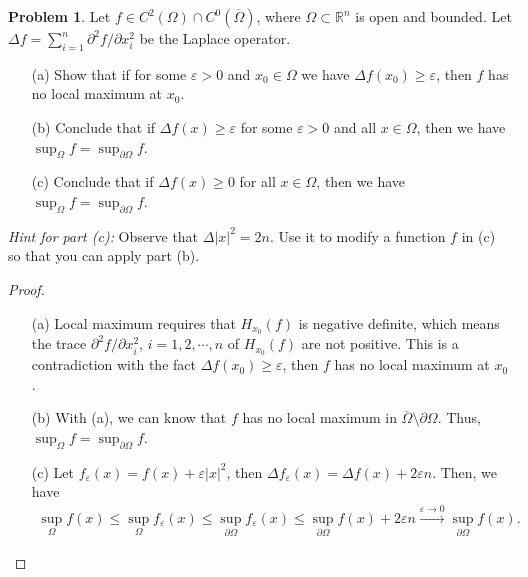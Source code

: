 \documentclass[11pt]{article}
\theoremstyle{definition}
\newtheorem{problem}{Problem}
\theoremstyle{definition}
\begin{document}
\begin{problem}
Let $f \in C^2(\Omega) \cap C^0(\overline{\Omega})$, where $\Omega \subset \mathbb{R}^n$ is open and bounded.
Let $\Delta f = \sum_{i=1}^n \partial^2f/\partial x_i^2$ be the Laplace operator.
\begin{enumerate}
    \item[(a)] Show that if for some $\varepsilon > 0$ and $x_0 \in \Omega$ we have $\Delta f(x_0) \geq \varepsilon$, then $f$ has no local maximum at $x_0$.
    
    \item[(b)] Conclude that if $\Delta f(x) \geq \varepsilon$ for some $\varepsilon > 0$ and all $x \in \Omega$, then we have $\sup_{\Omega} f = \sup_{\partial \Omega} f$.
    
    \item[(c)] Conclude that if $\Delta f(x) \geq 0$ for all $x \in \Omega$, then we have $\sup_{\Omega} f = \sup_{\partial \Omega} f$.
\end{enumerate}
{\em Hint for part (c):} Observe that $\Delta |x|^2 = 2n$. Use it to modify a function $f$ in (c) so that you can apply part (b).
\end{problem}

\begin{proof}
~\begin{enumerate}
    \item[(a)] Local maximum requires that $H_{x_0}(f)$ is negative definite, which means the trace $\partial^2f/\partial x_i^2$, $i = 1,2,\cdots,n$ of $H_{x_0}(f)$ are not positive. This is a contradiction with the fact $\Delta f(x_0) \geq \varepsilon$, then $f$ has no local maximum at $x_0$.
    
    \item[(b)] With (a), we can know that $f$ has no local maximum in $\overline{\Omega} \setminus \partial \Omega$. Thus, $\sup_{\Omega} f = \sup_{\partial \Omega} f$.
    
    \item[(c)] Let $f_\varepsilon(x) = f(x) + \varepsilon |x|^2$, then $\Delta f_\varepsilon(x) = \Delta f(x) + 2 \varepsilon n$. Then, we have
    \begin{align*}
        \sup_{\Omega} f(x) \leq \sup_{\Omega} f_\varepsilon(x) \leq \sup_{\partial\Omega} f_\varepsilon(x) \leq \sup_{\partial \Omega} f(x) + 2 \varepsilon n \xrightarrow{\varepsilon \to 0} \sup_{\partial \Omega} f(x).
    \end{align*}
\end{enumerate}
\end{proof}
\end{document}
